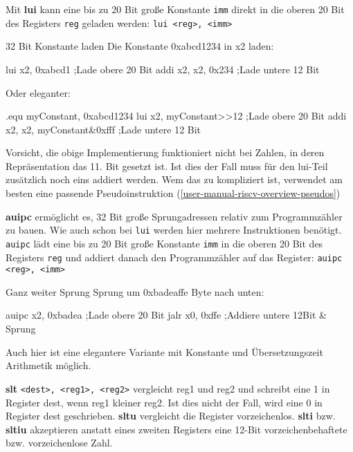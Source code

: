 Mit \textbf{lui} kann eine bis zu 20 Bit große Konstante \texttt{imm} direkt in die oberen 20 Bit des Registers \texttt{reg} geladen werden:
\texttt{lui <reg>, <imm>}
\begin{exampleblock}{32 Bit Konstante laden}
Die Konstante 0xabcd1234 in x2 laden:\\
\begin{riscv}
  lui x2, 0xabcd1 	;Lade obere 20 Bit
  addi x2, x2, 0x234	;Lade untere 12 Bit
\end{riscv}
Oder eleganter:
\begin{riscv}
  .equ myConstant, 0xabcd1234
  lui x2, myConstant>>12        ;Lade obere 20 Bit
  addi x2, x2, myConstant&0xfff ;Lade untere 12 Bit
\end{riscv}

Vorsicht, die obige Implementierung funktioniert nicht bei Zahlen, in deren
Repräsentation das 11. Bit gesetzt ist. Ist dies der Fall muss für den lui-Teil
zusätzlich noch eins addiert werden. Wem das zu kompliziert ist, verwendet am
besten eine passende Pseudoinstruktion
(\autoref{user-manual-riscv-overview-pseudos})

\end{exampleblock}

\textbf{auipc} ermöglicht es, 32 Bit große Sprungadressen relativ zum
Programmzähler zu bauen. Wie auch schon bei \texttt{lui} werden hier mehrere
Instruktionen benötigt. \texttt{auipc} lädt eine bis zu 20 Bit große Konstante
\texttt{imm} in die oberen 20 Bit des Registers \texttt{reg} und addiert danach
den Programmzähler auf das Register: \texttt{auipc <reg>, <imm>}

\begin{exampleblock}{Ganz weiter Sprung}
Sprung um 0xbadeaffe Byte nach unten:
\begin{riscv}
  auipc x2, 0xbadea	;Lade obere 20 Bit
  jalr x0, 0xffe	;Addiere untere 12Bit & Sprung
\end{riscv}
Auch hier ist eine elegantere Variante mit Konstante und Übersetzungszeit
Arithmetik möglich.
\end{exampleblock}

\textbf{slt} \texttt{<dest>, <reg1>, <reg2>} vergleicht reg1 und reg2 und
schreibt eine 1 in Register dest, wenn reg1 kleiner reg2. Ist dies nicht der
Fall, wird eine 0 in Register dest geschrieben. \textbf{sltu} vergleicht die
Register vorzeichenlos. \textbf{slti} bzw. \textbf{sltiu} akzeptieren anstatt
eines zweiten Registers eine 12-Bit vorzeichenbehaftete bzw. vorzeichenlose
Zahl.

